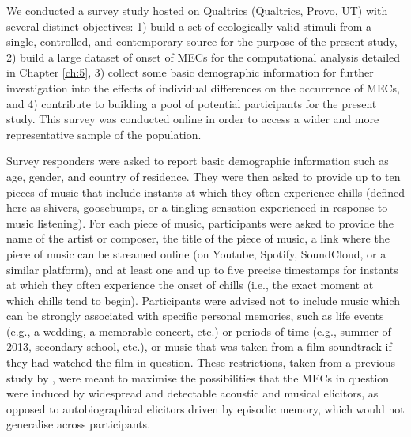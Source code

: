 We conducted a survey study hosted on Qualtrics (Qualtrics, Provo, UT) with several distinct objectives: 1) build a set of ecologically valid stimuli from a single, controlled, and contemporary source for the purpose of the present study, 2) build a large dataset of onset of MECs for the computational analysis detailed in Chapter \ref{ch:5}, 3) collect some basic demographic information for further investigation into the effects of individual differences on the occurrence of MECs, and 4) contribute to building a pool of potential participants for the present study. This survey was conducted online in order to access a wider and more representative sample of the population.

Survey responders were asked to report basic demographic information such as age, gender, and country of residence. They were then asked to provide up to ten pieces of music that include instants at which they often experience chills (defined here as shivers, goosebumps, or a tingling sensation experienced in response to music listening). For each piece of music, participants were asked to provide the name of the artist or composer, the title of the piece of music, a link where the piece of music can be streamed online (on Youtube, Spotify, SoundCloud, or a similar platform), and at least one and up to five precise timestamps for instants at which they often experience the onset of chills (i.e., the exact moment at which chills tend to begin). Participants were advised not to include music which can be strongly associated with specific personal memories, such as life events (e.g., a wedding, a memorable concert, etc.) or periods of time (e.g., summer of 2013, secondary school, etc.), or music that was taken from a film soundtrack if they had watched the film in question. These restrictions, taken from a previous study by \textcite{salimpoor2009}, were meant to maximise the possibilities that the MECs in question were induced by widespread and detectable acoustic and musical elicitors, as opposed to autobiographical elicitors driven by episodic memory, which would not generalise across participants.

